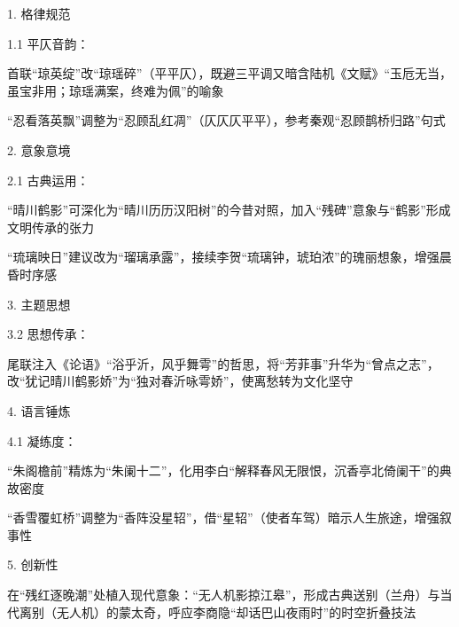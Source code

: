 \begin{tcolorbox}[
  colback=white, %
  colframe=black, 
  boxrule=1pt,        %
  arc=0mm             %
  ]
  \kaishu 
  1. 格律规范\par
  \hspace{2em}1.1 平仄音韵：\par
  \hspace{2em}首联“琼英绽”改“琼瑶碎”（平平仄），既避三平调又暗含陆机《文赋》“玉卮无当，虽宝非用；琼瑶满案，终难为佩”的喻象\par
  \hspace{2em}“忍看落英飘”调整为“忍顾乱红凋”（仄仄仄平平），参考秦观“忍顾鹊桥归路”句式\par
  2. 意象意境\par
  \hspace{2em}2.1 古典运用：\par
  \hspace{2em}“晴川鹤影”可深化为“晴川历历汉阳树”的今昔对照，加入“残碑”意象与“鹤影”形成文明传承的张力\par
  \hspace{2em}“琉璃映日”建议改为“瑠璃承露”，接续李贺“琉璃钟，琥珀浓”的瑰丽想象，增强晨昏时序感\par
  3. 主题思想\par
  \hspace{2em}3.2 思想传承：\par
  \hspace{2em}尾联注入《论语》“浴乎沂，风乎舞雩”的哲思，将“芳菲事”升华为“曾点之志”，改“犹记晴川鹤影娇”为“独对春沂咏雩娇”，使离愁转为文化坚守\par
  4. 语言锤炼\par
  \hspace{2em}4.1 凝练度：\par
  \hspace{2em}“朱阁檐前”精炼为“朱阑十二”，化用李白“解释春风无限恨，沉香亭北倚阑干”的典故密度\par
  \hspace{2em}“香雪覆虹桥”调整为“香阵没星轺”，借“星轺”（使者车驾）暗示人生旅途，增强叙事性\par
  5. 创新性\par
  \hspace{2em}在“残红逐晚潮”处植入现代意象：“无人机影掠江皋”，形成古典送别（兰舟）与当代离别（无人机）的蒙太奇，呼应李商隐“却话巴山夜雨时”的时空折叠技法\par

\end{tcolorbox}

